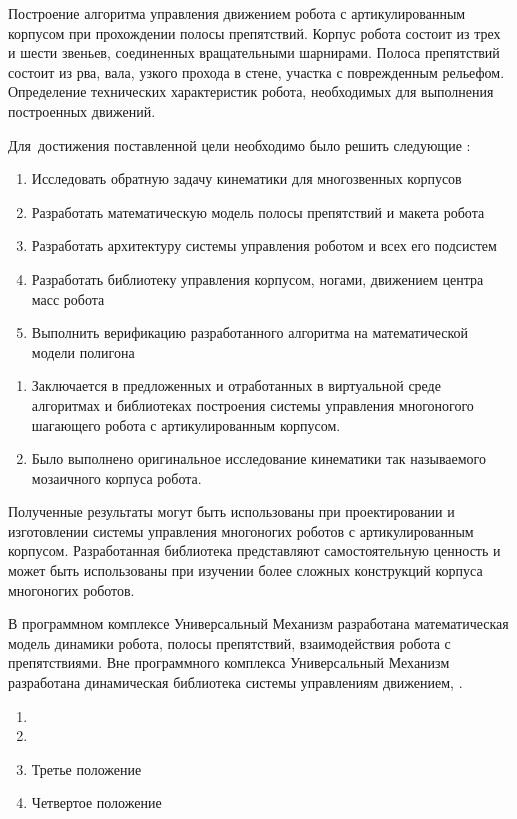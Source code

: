 {\aim} Построение алгоритма управления движением робота с артикулированным корпусом при прохождении полосы препятствий. Корпус робота состоит из трех и шести звеньев, соединенных вращательными шарнирами. Полоса препятствий состоит из рва, вала, узкого прохода в стене, участка с поврежденным рельефом. Определение технических характеристик робота, необходимых для выполнения построенных движений.

Для~достижения поставленной цели необходимо было решить следующие {\tasks}:
\begin{enumerate}
  \item Исследовать обратную задачу кинематики для многозвенных корпусов
  \item Разработать математическую модель полосы препятствий и макета робота
  \item Разработать архитектуру системы управления роботом и всех его подсистем
  \item Разработать библиотеку управления корпусом, ногами, движением центра масс робота
  \item Выполнить верификацию разработанного алгоритма на математической модели полигона
\end{enumerate}


{\novelty}
\begin{enumerate}
  \item Заключается в предложенных и отработанных в виртуальной среде алгоритмах и библиотеках построения системы управления многоногого шагающего робота с артикулированным корпусом.
  \item Было выполнено оригинальное исследование кинематики так называемого мозаичного корпуса робота.

\end{enumerate}

{\influence} Полученные результаты могут быть использованы при проектировании и изготовлении системы управления многоногих роботов с артикулированным корпусом. Разработанная библиотека представляют самостоятельную ценность и может быть использованы при изучении более сложных конструкций корпуса многоногих роботов.

{\methods} 
В программном комплексе Универсальный Механизм разработана математическая модель динамики робота, полосы препятствий, взаимодействия робота с препятствиями. Вне программного комплекса Универсальный Механизм разработана динамическая библиотека системы управлениям движением, .


{}
\begin{enumerate}
  \item {}
  \item {}
  \item Третье положение
  \item Четвертое положение
\end{enumerate}

